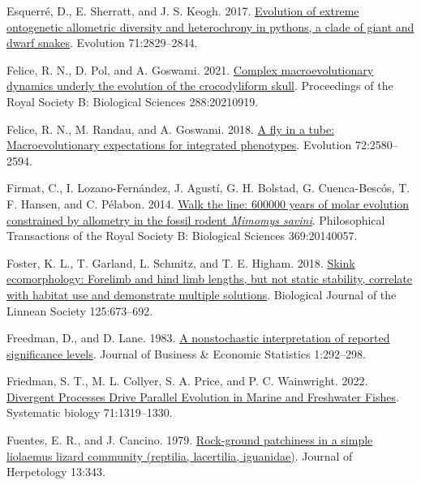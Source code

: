 \documentclass[
  11pt,
]{article}
\newlength{\cslhangindent}
\newlength{\cslentryspacingunit} %
\newenvironment{CSLReferences}[2] %
 {%
  \setlength{\parindent}{0pt}
  \ifodd #1
  \let\oldpar\par
  \def\par{\hangindent=\cslhangindent\oldpar}
  \fi
  \setlength{\parskip}{#2\cslentryspacingunit}
 }%
 {}
\begin{document}
\begin{CSLReferences}{1}{0}
\leavevmode{}%
Esquerré, D., E. Sherratt, and J. S. Keogh. 2017.
\href{https://doi.org/10.1111/evo.13382}{Evolution of extreme
ontogenetic allometric diversity and heterochrony in pythons, a clade of
giant and dwarf snakes}. Evolution 71:2829--2844.

\leavevmode{}%
Felice, R. N., D. Pol, and A. Goswami. 2021.
\href{https://doi.org/10.1098/rspb.2021.0919}{Complex macroevolutionary
dynamics underly the evolution of the crocodyliform skull}. Proceedings
of the Royal Society B: Biological Sciences 288:20210919.

\leavevmode{}%
Felice, R. N., M. Randau, and A. Goswami. 2018.
\href{https://doi.org/10.1111/evo.13608}{A fly in a tube:
Macroevolutionary expectations for integrated phenotypes}. Evolution
72:2580--2594.

\leavevmode{}%
Firmat, C., I. Lozano-Fernández, J. Agustí, G. H. Bolstad, G.
Cuenca-Bescós, T. F. Hansen, and C. Pélabon. 2014.
\href{https://doi.org/10.1098/rstb.2014.0057}{Walk the line: 600000
years of molar evolution constrained by allometry in the fossil rodent
\emph{{M}imomys savini}}. Philosophical Transactions of the Royal
Society B: Biological Sciences 369:20140057.

\leavevmode{}%
Foster, K. L., T. Garland, L. Schmitz, and T. E. Higham. 2018.
\href{https://doi.org/10.1093/biolinnean/bly146}{{Skink ecomorphology:
Forelimb and hind limb lengths, but not static stability, correlate with
habitat use and demonstrate multiple solutions}}. Biological Journal of
the Linnean Society 125:673--692.

\leavevmode{}%
Freedman, D., and D. Lane. 1983.
\href{https://doi.org/10.2307/1391660}{A nonstochastic interpretation of
reported significance levels}. Journal of Business {\&} Economic
Statistics 1:292--298.

\leavevmode{}%
Friedman, S. T., M. L. Collyer, S. A. Price, and P. C. Wainwright. 2022.
\href{https://doi.org/10.1093/sysbio/syab080}{{Divergent Processes Drive
Parallel Evolution in Marine and Freshwater Fishes}}. Systematic biology
71:1319--1330.

\leavevmode{}%
Fuentes, E. R., and J. Cancino. 1979.
\href{https://doi.org/10.2307/1563330}{Rock-ground patchiness in a
simple liolaemus lizard community (reptilia, lacertilia, iguanidae)}.
Journal of Herpetology 13:343.


\end{CSLReferences}
\end{document}
